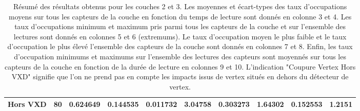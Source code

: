 \begin{table}
\begin{tabular}{|l|l|l|l|l|l|l|l|l|l|}
Hors VXD                & 80      & 0.624649           & 0.144535          & 0.011732   & 3.04758 & 0.303273 & 1.64302  & 0.152553  & 1.2151    \\ \hline
\end{tabular}
\caption{R\'esum\'e des r\'esultats obtenus pour les couches 2 et 3. Les moyennes et \'ecart-types des taux d'occupations moyens sur tous les capteurs de la couche en fonction du temps de lecture sont donn\'es en colonne 3 et 4. Les taux d'occupations minimum et maximum pris parmi tous les capteurs de la couche et sur l'ensemble des lectures sont donn\'es en colonnes 5 et 6 (extremums). Le taux d'occupation moyen le plus faible et le taux d'occupation le plus \'elev\'e l'ensemble des capteurs de la couche sont donn\'es en colonnes 7 et 8. Enfin, les taux d'occupation minimums et maximums sur l'ensemble des lectures des capteurs sont moyenn\'es sur tous les capteurs de la couche en fonction de la dur\'ee de lecture en colonnes 9 et 10. L'indication "Coupure Vertex Hors VXD" signifie que l'on ne prend pas en compte les impacts issus de vertex situ\'es en dehors du d\'etecteur de vertex.}
\label{tab:couche_2_3_occupations}
\end{table}
  
